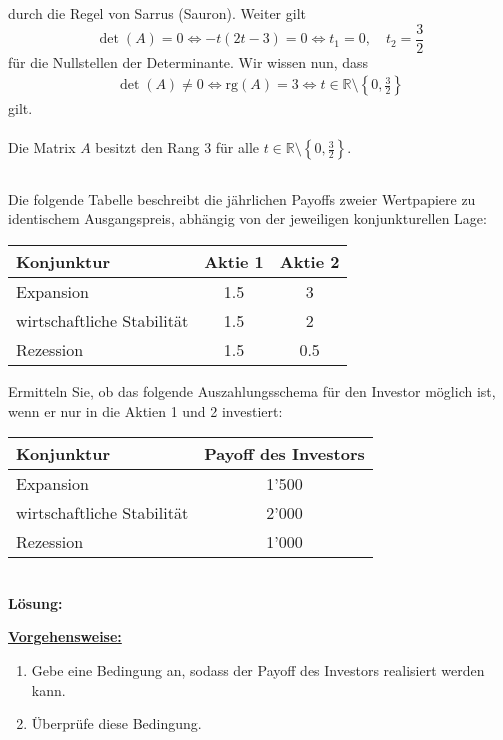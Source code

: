 durch die Regel von Sarrus (Sauron).
Weiter gilt
\begin{equation*}
\det(A) = 0 
\Leftrightarrow
-t ( 2 t - 3) = 0 
\Leftrightarrow
t_1 = 0, \quad t_2 = \frac{3}{2}
\end{equation*}
für die Nullstellen der Determinante.
Wir wissen nun, dass 
\begin{align*}
\det(A) \neq 0 
\Leftrightarrow
\text{rg}(A) = 3 
\Leftrightarrow
t \in \mathbb{R} \setminus \left\lbrace 0, \frac{3}{2} \right\rbrace
\end{align*}
gilt.\\
\\
Die Matrix $A$ besitzt den Rang $3$ für alle $t \in \mathbb{R} \setminus \left\lbrace 0, \frac{3}{2} \right\rbrace$.

\newpage

\subsection*{}
Die folgende Tabelle beschreibt die jährlichen Payoffs zweier Wertpapiere zu identischem Ausgangspreis,
abhängig von der jeweiligen konjunkturellen Lage:
\begin{table}[H]
\centering
\begin{tabular}{lcc}
\hline 
Konjunktur & Aktie 1 & Aktie 2 \\ 
\hline 
Expansion & 1.5 & 3 \\ 
wirtschaftliche Stabilität & 1.5 & 2 \\ 
Rezession & 1.5 & 0.5 \\ 
\hline 
\end{tabular} 
\end{table}
Ermitteln Sie, ob das folgende Auszahlungsschema für den Investor möglich ist,
wenn er nur in die Aktien 1 und 2 investiert:
\begin{table}[H]
\centering
\begin{tabular}{lc}
\hline 
Konjunktur & Payoff des Investors \\ 
\hline 
Expansion & 1'500 \\ 
wirtschaftliche Stabilität & 2'000 \\ 
Rezession & 1'000 \\ 
\hline 
\end{tabular} 
\end{table}
\ \\
\textbf{Lösung:}
\begin{mdframed}
\underline{\textbf{Vorgehensweise:}}
\begin{enumerate}
\renewcommand{\labelenumi}{\theenumi.}
\item Gebe eine Bedingung an, sodass der Payoff des Investors realisiert werden kann.
\item Überprüfe diese Bedingung.
\end{enumerate}
\end{mdframed}
